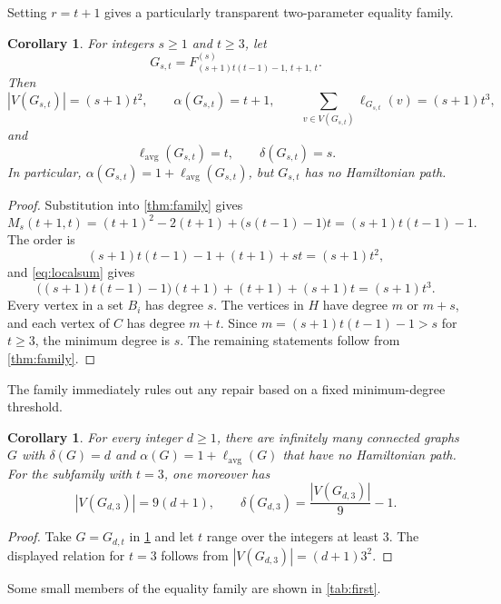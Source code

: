 \documentclass[11pt]{article}
\newtheorem{corollary}[theorem]{Corollary}
\newcommand{\lavg}{\ell_{\mathrm{avg}}}
\begin{document}
Setting $r=t+1$ gives a particularly transparent two-parameter equality family.

\begin{corollary}\label{cor:equality}
For integers $s\geq 1$ and $t\geq 3$, let
\[
  G_{s,t}=F^{(s)}_{(s+1)t(t-1)-1,\,t+1,\,t}.
\]
Then
\[
  |V(G_{s,t})|=(s+1)t^2,\qquad
  \alpha(G_{s,t})=t+1,\qquad
  \sum_{v\in V(G_{s,t})}\ell_{G_{s,t}}(v)=(s+1)t^3,
\]
and
\[
  \lavg(G_{s,t})=t,\qquad \delta(G_{s,t})=s.
\]
In particular, $\alpha(G_{s,t})=1+\lavg(G_{s,t})$, but $G_{s,t}$ has no
Hamiltonian path.
\end{corollary}

\begin{proof}
Substitution into \cref{thm:family} gives
\[
  M_s(t+1,t)
  =(t+1)^2-2(t+1)+\bigl(s(t-1)-1\bigr)t
  =(s+1)t(t-1)-1.
\]
The order is
\[
  (s+1)t(t-1)-1+(t+1)+st=(s+1)t^2,
\]
and \cref{eq:localsum} gives
\[
  \bigl((s+1)t(t-1)-1\bigr)(t+1)+(t+1)+(s+1)t
  =(s+1)t^3.
\]
Every vertex in a set $B_i$ has degree $s$.  The vertices in $H$ have degree $m$ or
$m+s$, and each vertex of $C$ has degree $m+t$.  Since
$m=(s+1)t(t-1)-1>s$ for $t\geq 3$, the minimum degree is $s$.  The remaining statements
follow from \cref{thm:family}.
\end{proof}

The family immediately rules out any repair based on a fixed minimum-degree threshold.

\begin{corollary}\label{cor:min-degree}
For every integer $d\geq 1$, there are infinitely many connected graphs $G$ with
$\delta(G)=d$ and $\alpha(G)=1+\lavg(G)$ that have no Hamiltonian path.
For the subfamily with $t=3$, one moreover has
\[
  |V(G_{d,3})|=9(d+1),\qquad \delta(G_{d,3})=\frac{|V(G_{d,3})|}{9}-1.
\]
\end{corollary}

\begin{proof}
Take $G=G_{d,t}$ in \cref{cor:equality} and let $t$ range over the integers at least $3$.
The displayed relation for $t=3$ follows from $|V(G_{d,3})|=(d+1)3^2$.
\end{proof}

Some small members of the equality family are shown in \cref{tab:first}.
\end{document}
